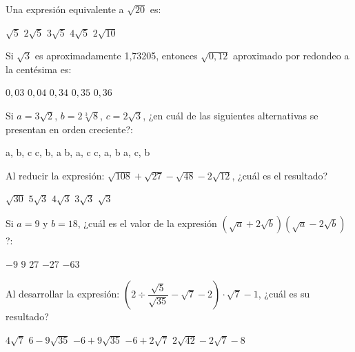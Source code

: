 \documentclass[]{srs}
\begin{document}
\begin{preguntas}[after-item-skip=2cm]
  \pregunta Una expresión equivalente a $\sqrt{20}$ es: \\
  \begin{vertical}
    \alternativa $\sqrt{5}$
    \alternativa $2\sqrt{5}$
    \alternativa $3\sqrt{5}$
    \alternativa $4\sqrt{5}$
    \alternativa $2\sqrt{10}$

  \end{vertical}

  \pregunta Si $\sqrt{3}$ es aproximadamente 1,73205, entonces $\sqrt{0,12}$ aproximado
  por redondeo a la centésima es: \\
  \begin{vertical}
    \alternativa $0,03$
    \alternativa $0,04$
    \alternativa $0,34$
    \alternativa $0,35$
    \alternativa $0,36$
  \end{vertical}

  \pregunta Si $a=3\sqrt{2}$, $b=2\sqrt[3]{8}$, $c=2\sqrt{3}$, ¿en cuál de las siguientes
  alternativas se presentan en orden creciente?: \\
  \begin{vertical}
    \alternativa a, b, c
    \alternativa c, b, a
    \alternativa b, a, c
    \alternativa c, a, b
    \alternativa a, c, b
  \end{vertical}

  \pregunta Al reducir la expresión: $\sqrt{108} + \sqrt{27} - \sqrt{48} - 2\sqrt{12}$,
  ¿cuál es el resultado? \\
  \begin{vertical}
    \alternativa $\sqrt{30}$
    \alternativa $5\sqrt{3}$
    \alternativa $4\sqrt{3}$
    \alternativa $3\sqrt{3}$
    \alternativa $\sqrt{3}$
  \end{vertical}

  \pregunta Si $a=9$ y $b=18$, ¿cuál es el valor de la expresión
  $\left(\sqrt{a}+2\sqrt{b}\right)\left(\sqrt{a}-2\sqrt{b}\right)$?: \\
  \begin{vertical}
    \alternativa $-9$
    \alternativa $9$
    \alternativa $27$
    \alternativa $-27$
    \alternativa $-63$
  \end{vertical}

  \pregunta Al desarrollar la expresión:
  $\left(2\div\dfrac{\sqrt{5}}{\sqrt{35}}-\sqrt{7}-2\right)\cdot\sqrt{7} -1$,
  ¿cuál es su resultado? \\
  \begin{vertical}
    \alternativa $4\sqrt{7}$
    \alternativa $6-9\sqrt{35}$
    \alternativa $-6+9\sqrt{35}$
    \alternativa $-6+2\sqrt{7}$
    \alternativa $2\sqrt{42}-2\sqrt{7} -8$
  \end{vertical}


\end{preguntas}
\end{document}
